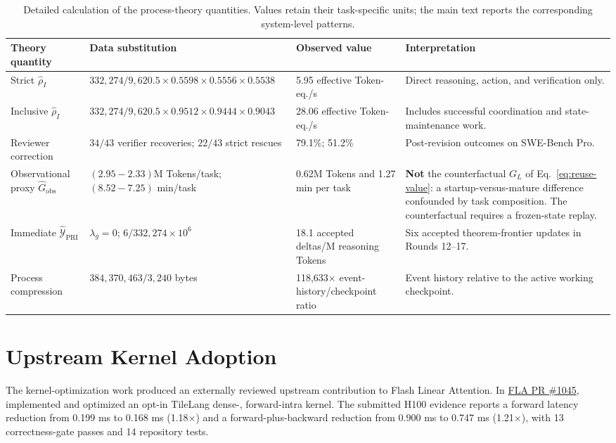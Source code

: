 \begin{table}[H]
\centering
\scriptsize
\renewcommand{\arraystretch}{1.13}
\begin{tabularx}{\linewidth}{@{}p{2.25cm}p{4.3cm}p{2.15cm}X@{}}
\toprule
\rowcolor{papersand}
\textbf{Theory quantity} & \textbf{Data substitution} & \textbf{Observed value} & \textbf{Interpretation} \\
\midrule
Strict $\widehat{\rho}_I$ & $332{,}274/9{,}620.5\times0.5598\times0.5556\times0.5538$ & 5.95 effective Token-eq./s & Direct reasoning, action, and verification only. \\
Inclusive $\widehat{\rho}_I$ & $332{,}274/9{,}620.5\times0.9512\times0.9444\times0.9043$ & 28.06 effective Token-eq./s & Includes successful coordination and state-maintenance work. \\
Reviewer correction & $34/43$ verifier recoveries; $22/43$ strict rescues & 79.1\%; 51.2\% & Post-revision outcomes on SWE-Bench Pro. \\
Observational proxy $\hat{G}_{\mathrm{obs}}$ & $(2.95-2.33)$M Tokens/task; $(8.52-7.25)$ min/task & 0.62M Tokens and 1.27 min per task & \textbf{Not} the counterfactual $G_L$ of Eq.~\ref{eq:reuse-value}: a startup-versus-mature difference confounded by task composition. The counterfactual requires a frozen-state replay. \\
Immediate $\widehat{\mathcal{Y}}_{\mathrm{PRI}}$ & $\lambda_g=0$; $6/332{,}274\times10^6$ & 18.1 accepted deltas/M reasoning Tokens & Six accepted theorem-frontier updates in Rounds 12--17. \\
Process compression & $384{,}370{,}463/3{,}240$ bytes & 118,633$\times$ event-history/checkpoint ratio & Event history relative to the active working checkpoint. \\
\bottomrule
\end{tabularx}
\caption{Detailed calculation of the process-theory quantities. Values retain
their task-specific units; the main text reports the corresponding system-level
patterns.}
\label{tab:formula-instantiation}
\end{table}

\section{Upstream Kernel Adoption}
\label{app:upstream-kernel}

The kernel-optimization work produced an externally reviewed upstream
contribution to Flash Linear Attention. In
\href{https://github.com/fla-org/flash-linear-attention/pull/1045}
{FLA PR \#1045}, \systemname implemented and optimized an opt-in TileLang
 dense-,  forward-intra kernel. The submitted
H100 evidence reports a forward latency reduction from 0.199 ms to 0.168 ms
(1.18$\times$) and a forward-plus-backward reduction from 0.900 ms to 0.747 ms
(1.21$\times$), with 13 correctness-gate passes and 14 repository tests.


